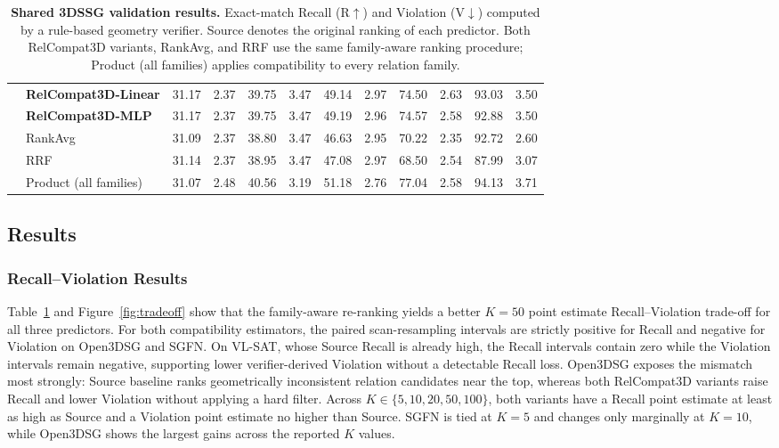 \begin{table}[!t]
{\begin{tabular}{@{}llrrrrrrrrrr@{}}
    & \textbf{RelCompat3D-Linear} & 31.17 & 2.37 & 39.75 & 3.47 & 49.14 & 2.97 & 74.50 & 2.63 & 93.03 & 3.50 \\
    & \textbf{RelCompat3D-MLP} & 31.17 & 2.37 & 39.75 & 3.47 & 49.19 & 2.96 & 74.57 & 2.58 & 92.88 & 3.50 \\
    & RankAvg & 31.09 & 2.37 & 38.80 & 3.47 & 46.63 & 2.95 & 70.22 & 2.35 & 92.72 & 2.60 \\
    & RRF & 31.14 & 2.37 & 38.95 & 3.47 & 47.08 & 2.97 & 68.50 & 2.54 & 87.99 & 3.07 \\
    & Product (all families) & 31.07 & 2.48 & 40.56 & 3.19 & 51.18 & 2.76 & 77.04 & 2.58 & 94.13 & 3.71 \\
    \bottomrule
    \end{tabular}
    }
    \caption{\textbf{Shared 3DSSG validation results.} Exact-match Recall (R$\uparrow$) and Violation (V$\downarrow$) computed by a rule-based geometry verifier. Source denotes the original ranking of each predictor. Both RelCompat3D variants, RankAvg, and RRF use the same family-aware ranking procedure; Product (all families) applies compatibility to every relation family.}
    \label{tab:main-results}
\end{table}

\subsection{Results}
\subsubsection{Recall–Violation Results}
Table~\ref{tab:main-results} and Figure~\ref{fig:tradeoff} show that the family-aware re-ranking yields a better $K=50$ point estimate Recall--Violation trade-off for all three predictors. For both compatibility estimators, the paired scan-resampling intervals are strictly positive for Recall and negative for Violation on Open3DSG and SGFN. On VL-SAT, whose Source Recall is already high, the Recall intervals contain zero while the Violation intervals remain negative, supporting lower verifier-derived Violation without a detectable Recall loss. Open3DSG exposes the mismatch most strongly: Source baseline ranks geometrically inconsistent relation candidates near the top, whereas both RelCompat3D variants raise Recall and lower Violation without applying a hard filter. Across $K\in\{5,10,20,50,100\}$, both variants have a Recall point estimate at least as high as Source and a Violation point estimate no higher than Source. SGFN is tied at $K=5$ and changes only marginally at $K=10$, while Open3DSG shows the largest gains across the reported $K$ values. 

